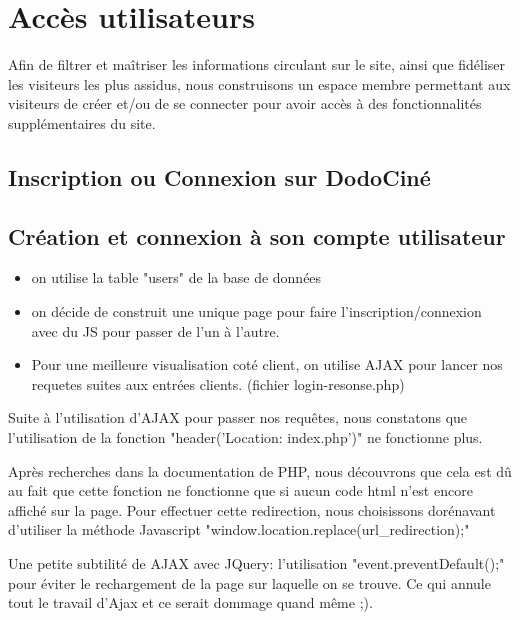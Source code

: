 \chapter{Accès utilisateurs}

    Afin de filtrer et maîtriser les informations circulant sur le site, ainsi que fidéliser les visiteurs les plus assidus, nous construisons un espace membre permettant aux visiteurs de créer et/ou de se connecter pour avoir accès à des fonctionnalités supplémentaires du site.

    \section{Inscription ou Connexion sur DodoCiné}


    \section{Création et connexion à son compte utilisateur}

            \begin{itemize}
                \item on utilise la table "users" de la base de données
                \item on décide de construit une unique page pour faire l'inscription/connexion
                avec du JS pour passer de l'un à l'autre.
                \item Pour une meilleure visualisation coté client, on utilise AJAX pour lancer nos requetes suites aux entrées clients. (fichier login-resonse.php)
            \end{itemize}

            \begin{rmq}
                Suite à l'utilisation d'AJAX pour passer nos requêtes, nous constatons que l'utilisation de la fonction "header('Location: index.php')" ne fonctionne plus. 

                Après recherches dans la documentation de PHP, nous découvrons que cela est dû au fait que cette fonction ne fonctionne que si aucun code html n'est encore affiché sur la page. Pour effectuer cette redirection, nous choisissons dorénavant d'utiliser la méthode Javascript "window.location.replace(url\_redirection);"  
            \end{rmq}

            \begin{rmq}
                Une petite subtilité de AJAX avec JQuery: l'utilisation "event.preventDefault();" pour éviter le rechargement de la page sur laquelle on se trouve.  Ce qui annule tout le travail d'Ajax et ce serait dommage quand même ;).
            \end{rmq}